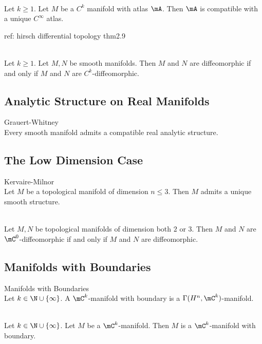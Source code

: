 \documentclass[a4paper]{article}
\begin{document}
\begin{prp}{}{}\\
Let $k\geq 1$. Let $M$ be a $C^k$ manifold with atlas $\mA$. Then $\mA$ is compatible with a unique $C^\infty$ atlas. 
\end{prp}

ref: hirsch differential topology thm2.9

\begin{prp}{}{}\\
Let $k\geq 1$. Let $M,N$ be smooth manifolds. Then $M$ and $N$ are diffeomorphic if and only if $M$ and $N$ are $C^k$-diffeomorphic. 
\end{prp}

\subsection{Analytic Structure on Real Manifolds}
\begin{thm}{Grauert-Whitney}{}\\
Every smooth manifold admits a compatible real analytic structure. 
\end{thm}

\subsection{The Low Dimension Case}
\begin{thm}{Kervaire-Milnor}{}\\
Let $M$ be a topological manifold of dimension $n\leq 3$. Then $M$ admits a unique smooth structure. 
\end{thm}

\begin{prp}{}{}\\
Let $M,N$ be topological manifolds of dimension both $2$ or $3$. Then $M$ and $N$ are $\mC^0$-diffeomorphic if and only if $M$ and $N$ are diffeomorphic. 
\end{prp}

\subsection{Manifolds with Boundaries}
\begin{defn}{Manifolds with Boundaries}{}\\
Let $k\in\N\cup\{\infty\}$. A $\mC^k$-manifold with boundary is a $\Gamma(H^n,\mC^k)$-manifold. 
\end{defn}

\begin{lmm}{}{}\\
Let $k\in\N\cup\{\infty\}$. Let $M$ be a $\mC^k$-manifold. Then $M$ is a $\mC^k$-manifold with boundary. 
\end{lmm}
\end{document}
